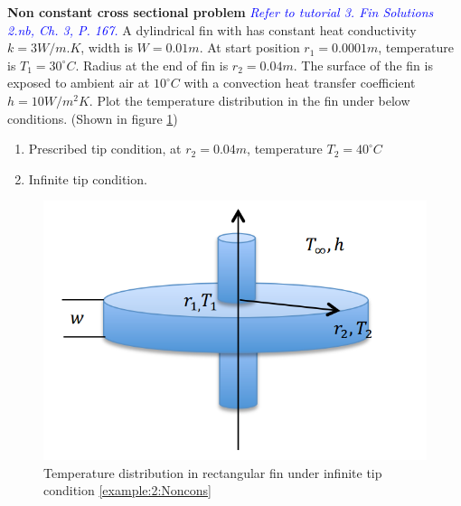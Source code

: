 \begin{example}
\label{example:2:Noncons}
\textbf{Non constant cross sectional problem}
\textcolor{blue} {\emph{Refer to tutorial 3.  Fin Solutions 2.nb, Ch. 3, P. 167.}}
A dylindrical fin with has constant heat conductivity  $k=3W/m.K$, width is
$W=0.01m$. At start position $r_1=0.0001m$, temperature is $T_1=30^\circ C$. Radius at
the end of fin is $r_2=0.04m$. The surface of the fin is exposed to ambient air at
$10^\circ C$ with a convection heat transfer coefficient $h=10W/m^2K$.
Plot the temperature distribution in the fin under below conditions. (Shown in figure \ref{fig:2:16})

\begin{enumerate}
\item Prescribed tip condition, at $r_2=0.04m$, temperature $T_2=40^\circ C$
\item Infinite tip condition.
\end{enumerate}
\begin{figure}[H]
  \centering
    \includegraphics[scale=0.4]{figures/ch2/16}
    \caption{Temperature distribution in rectangular fin under infinite tip condition \ref{example:2:Noncons}}
    \label{fig:2:16}
\end{figure}
\end{example}


